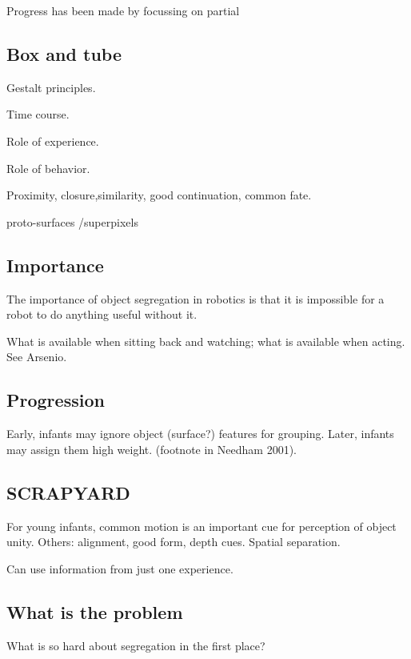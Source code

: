  Progress has been made by focussing on 
partial



\subsection{Box and tube}



Gestalt principles.

Time course.

Role of experience.

Role of behavior.

Proximity, closure,similarity, good continuation, common fate.

proto-surfaces /superpixels

\subsection{Importance}

The importance of object segregation in robotics is 
that it is impossible for a robot to do anything 
useful without it.  

What is available when sitting back and watching; 
what is available when acting.  See Arsenio.


\subsection{Progression}

Early, infants may ignore object (surface?) features for grouping.
Later, infants may assign them high weight. (footnote in
Needham 2001).


\subsection{SCRAPYARD}

For young infants, common motion is an important cue for 
perception of object unity.  Others: alignment, good form,
depth cues.  Spatial separation.

Can use information from just one experience.





\subsection{What is the problem}

What is so hard about segregation in the first place?

